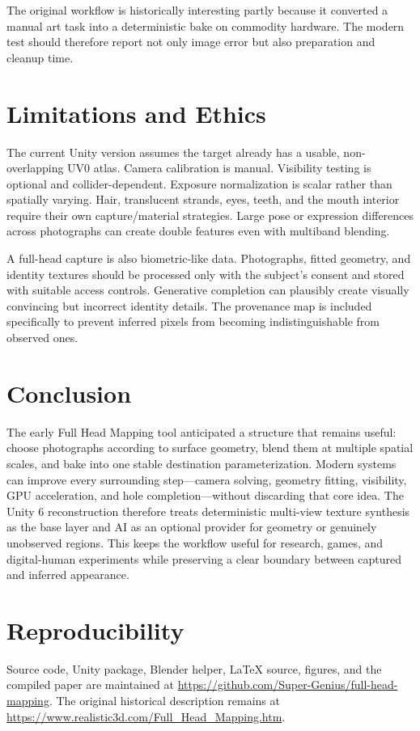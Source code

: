 \documentclass[10pt]{article}
\begin{document}
The original workflow is historically interesting partly because it converted a manual art task into a deterministic bake on commodity hardware. The modern test should therefore report not only image error but also preparation and cleanup time.

\section{Limitations and Ethics}
The current Unity version assumes the target already has a usable, non-overlapping UV0 atlas. Camera calibration is manual. Visibility testing is optional and collider-dependent. Exposure normalization is scalar rather than spatially varying. Hair, translucent strands, eyes, teeth, and the mouth interior require their own capture/material strategies. Large pose or expression differences across photographs can create double features even with multiband blending.

A full-head capture is also biometric-like data. Photographs, fitted geometry, and identity textures should be processed only with the subject's consent and stored with suitable access controls. Generative completion can plausibly create visually convincing but incorrect identity details. The provenance map is included specifically to prevent inferred pixels from becoming indistinguishable from observed ones.

\section{Conclusion}
The early Full Head Mapping tool anticipated a structure that remains useful: choose photographs according to surface geometry, blend them at multiple spatial scales, and bake into one stable destination parameterization. Modern systems can improve every surrounding step---camera solving, geometry fitting, visibility, GPU acceleration, and hole completion---without discarding that core idea. The Unity 6 reconstruction therefore treats deterministic multi-view texture synthesis as the base layer and AI as an optional provider for geometry or genuinely unobserved regions. This keeps the workflow useful for research, games, and digital-human experiments while preserving a clear boundary between captured and inferred appearance.

\section*{Reproducibility}
Source code, Unity package, Blender helper, LaTeX source, figures, and the compiled paper are maintained at \url{https://github.com/Super-Genius/full-head-mapping}. The original historical description remains at \url{https://www.realistic3d.com/Full_Head_Mapping.htm}.
\end{document}

